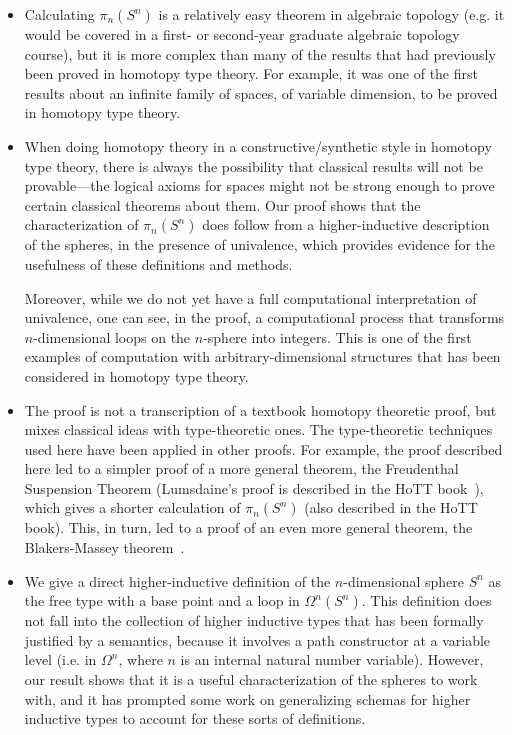 \begin{itemize}

\item Calculating $\pi_n(S^n)$ is a relatively easy theorem in algebraic
  topology (e.g. it would be covered in a first- or second-year graduate
  algebraic topology course), but it is more complex than many of the
  results that had previously been proved in homotopy type theory.  For
  example, it was one of the first results about an infinite family of
  spaces, of variable dimension, to be proved in homotopy type theory.

\item When doing homotopy theory in a constructive/synthetic
  style in homotopy type theory, there is always the possibility that
  classical results will not be provable---the logical axioms for spaces
  might not be strong enough to prove certain classical theorems about them.
  Our proof shows that the characterization of $\pi_n(S^n)$ does follow
  from a higher-inductive description of the spheres, in the presence of
  univalence, which provides evidence for the usefulness of
  these definitions and methods.  

  Moreover, while we do not yet have a full computational interpretation
  of univalence, one can see, in the proof, a computational process that
  transforms $n$-dimensional loops on the $n$-sphere into integers.
  This is one of the first examples of computation with
  arbitrary-dimensional structures that has been considered in homotopy
  type theory.  

\item The proof is not a transcription of a textbook homotopy theoretic
  proof, but mixes classical ideas with type-theoretic ones.  
  The type-theoretic techniques used here have been applied in other
  proofs.  For example, the proof described here led to a simpler proof
  of a more general theorem, the Freudenthal Suspension Theorem
  (Lumsdaine's proof is described in the HoTT book~\citep{uf13hott-book}), which
  gives a shorter calculation of $\pi_n(S^n)$ (also described in the
  HoTT book).  This, in turn, led to a proof of an even more general
  theorem, the Blakers-Massey theorem~\citep{fll13blakersmassey}.  

\item We give a direct higher-inductive definition of the
  $n$-dimensional sphere $S^n$ as the free type with a base point
   and a loop in $\Omega^n(S^n)$.  This definition does not
  fall into the collection of higher inductive types that has been
  formally justified by a semantics, because it involves a path
  constructor at a variable level (i.e. in $\Omega^n$, where $n$ is an
  internal natural number variable).  However, our result shows that it is a useful
  characterization of the spheres to work with, and it has prompted some
  work on generalizing schemas for higher inductive types to account for
  these sorts of definitions.


\end{itemize}
